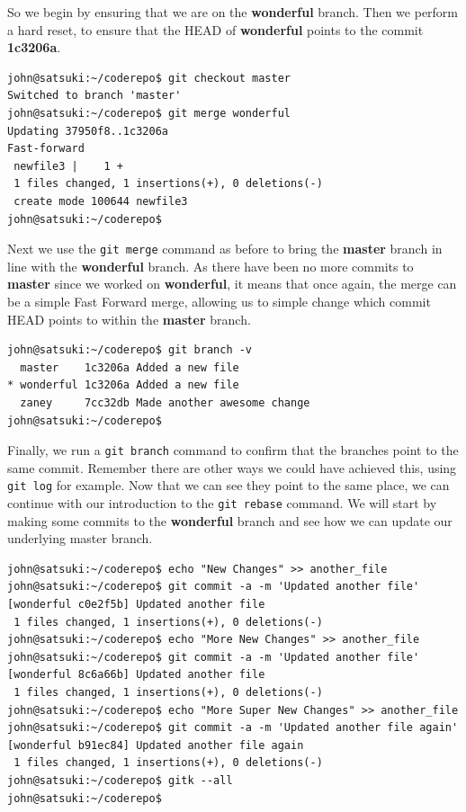 So we begin by ensuring that we are on the \textbf{wonderful} branch.  Then we perform a hard reset, to ensure that the HEAD of \textbf{wonderful} points to the commit \textbf{1c3206a}.

\begin{Verbatim}
john@satsuki:~/coderepo$ git checkout master
Switched to branch 'master'
john@satsuki:~/coderepo$ git merge wonderful 
Updating 37950f8..1c3206a
Fast-forward
 newfile3 |    1 +
 1 files changed, 1 insertions(+), 0 deletions(-)
 create mode 100644 newfile3
john@satsuki:~/coderepo$
\end{Verbatim}

Next we use the \texttt{git merge} command as before to bring the \textbf{master} branch in line with the \textbf{wonderful} branch.  As there have been no more commits to \textbf{master} since we worked on \textbf{wonderful}, it means that once again, the merge can be a simple Fast Forward merge, allowing us to simple change which commit HEAD points to within the \textbf{master} branch.

\begin{Verbatim} 
john@satsuki:~/coderepo$ git branch -v
  master    1c3206a Added a new file
* wonderful 1c3206a Added a new file
  zaney     7cc32db Made another awesome change
john@satsuki:~/coderepo$ 
\end{Verbatim}

Finally, we run a \texttt{git branch} command to confirm that the branches point to the same commit.  Remember there are other ways we could have achieved this, using \texttt{git log} for example.  Now that we can see they point to the same place, we can continue with our introduction to the \texttt{git rebase} command.  We will start by making some commits to the \textbf{wonderful} branch and see how we can update our underlying master branch.

\begin{Verbatim}
john@satsuki:~/coderepo$ echo "New Changes" >> another_file 
john@satsuki:~/coderepo$ git commit -a -m 'Updated another file'
[wonderful c0e2f5b] Updated another file
 1 files changed, 1 insertions(+), 0 deletions(-)
john@satsuki:~/coderepo$ echo "More New Changes" >> another_file 
john@satsuki:~/coderepo$ git commit -a -m 'Updated another file'
[wonderful 8c6a66b] Updated another file
 1 files changed, 1 insertions(+), 0 deletions(-)
john@satsuki:~/coderepo$ echo "More Super New Changes" >> another_file 
john@satsuki:~/coderepo$ git commit -a -m 'Updated another file again'
[wonderful b91ec84] Updated another file again
 1 files changed, 1 insertions(+), 0 deletions(-)
john@satsuki:~/coderepo$ gitk --all
john@satsuki:~/coderepo$ 
\end{Verbatim}

